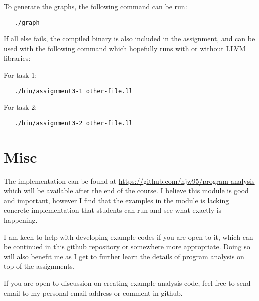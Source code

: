 \documentclass[11pt,a4paper,fleqn]{article}
\begin{document}
To generate the graphs, the following command can be run:

\begin{verbatim}
   ./graph
\end{verbatim}

If all else fails, the compiled binary is also included in the assignment, and can be used with the following command which hopefully runs with or without LLVM libraries:

For task 1:
\begin{verbatim}
   ./bin/assignment3-1 other-file.ll
\end{verbatim}

For task 2:
\begin{verbatim}
   ./bin/assignment3-2 other-file.ll
\end{verbatim}

\section {Misc}

The implementation can be found at \url{https://github.com/hjw95/program-analysis} which will be available after the end of the course.
I believe this module is good and important, however I find that the examples in the module is lacking concrete implementation that students can run and see what exactly is happening.

I am keen to help with developing example codes if you are open to it, which can be continued in this github repository or somewhere more appropriate.
Doing so will also benefit me as I get to further learn the details of program analysis on top of the assignments.

If you are open to discussion on creating example analysis code, feel free to send email to my personal email address or comment in github.
\end{document}
